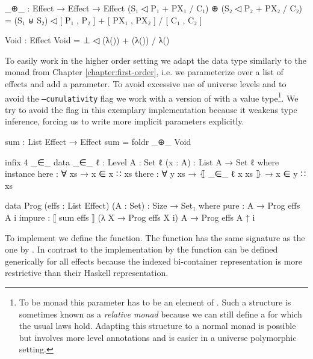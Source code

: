 \begin{code}
_⊕_ : Effect → Effect → Effect
(S₁ ◁ P₁ + PX₁ / C₁) ⊕ (S₂ ◁ P₂ + PX₂ / C₂) =
  (S₁ ⊎ S₂) ◁ [ P₁ , P₂ ] + [ PX₁ , PX₂ ] / [ C₁ , C₂ ]

Void : Effect
Void = ⊥ ◁ (λ()) + (λ()) / λ()
\end{code}
To easily work in the higher order setting we adapt the 
data type similarly to the  monad from Chapter
\ref{chapter:first-order}, i.e. we parameterize over a list of effects and add a
 parameter.
To avoid excessive use of universe levels and to avoid the \texttt{--cumulativity}
flag we work with a version of  with a
 value type\footnote{To be monad this parameter has to be an
  element of .
  Such a structure is sometimes known as a \textit{relative monad} because we
  can still define a \AgdaFunction{>>=} for which the usual laws hold.
  Adapting this structure to a normal monad is possible but involves more level
  annotations and is easier in a universe polymorphic setting.}.
We try to avoid the flag in this exemplary implementation because it weakens
type inference, forcing us to write more implicit parameters explicitly.

\begin{code}[hide]
sum : List Effect → Effect
sum = foldr _⊕_ Void

infix 4 _∈_
data _∈_ {ℓ : Level} {A : Set ℓ} (x : A) : List A → Set ℓ where
  instance
    here   : ∀ {xs} → x ∈ x ∷ xs
    there  : ∀ {y xs} → ⦃ _∈_ {ℓ} x xs ⦄ → x ∈ y ∷ xs
\end{code}
\begin{code}
data Prog (effs : List Effect) (A : Set) : {Size} → Set₁ where
  pure    : A → Prog effs A {i}
  impure  : ⟦ sum effs ⟧ (λ X → Prog effs X {i}) A → Prog effs A {↑ i}
\end{code}
To implement \AgdaFunction{>>=} we define the  function.
The function has the same signature as the one by
\textcite{DBLP:conf/haskell/WuSH14}.
In contrast to the implementation by \textcite{DBLP:conf/haskell/WuSH14} the
function can be defined generically for all effects because the indexed
bi-container representation is more restrictive than their Haskell
representation.

